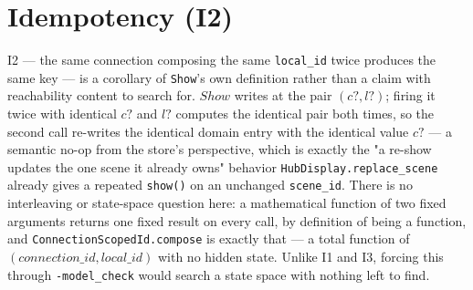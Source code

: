 \documentclass[a4paper,10pt,fleqn]{article}
\begin{document}
\section{Idempotency (I2)}
\label{sec:idempotency}

I2 --- the same connection composing the same \texttt{local\_id} twice
produces the same key --- is a corollary of \texttt{Show}'s own definition
rather than a claim with reachability content to search for. $\mathit{Show}$
writes at the pair $(c?, l?)$; firing it twice with identical $c?$ and $l?$
computes the identical pair both times, so the second call re-writes the
identical domain entry with the identical value $c?$ --- a semantic no-op from
the store's perspective, which is exactly the "a re-show updates the one scene
it already owns" behavior \texttt{HubDisplay.replace\_scene} already gives a
repeated \texttt{show()} on an unchanged \texttt{scene\_id}. There is no
interleaving or state-space question here: a mathematical function of two
fixed arguments returns one fixed result on every call, by definition of
being a function, and \texttt{ConnectionScopedId.compose} is exactly that ---
a total function of $(connection\_id, local\_id)$ with no hidden state. Unlike
I1 and I3, forcing this through \texttt{-model\_check} would search a state
space with nothing left to find.
\end{document}
